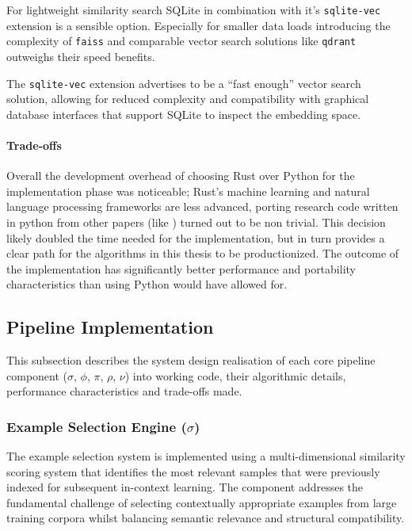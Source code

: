 For lightweight similarity search SQLite in combination with it's
\texttt{sqlite-vec} extension is a sensible option. Especially for smaller data
loads introducing the complexity of \texttt{faiss} and comparable vector search
solutions like \texttt{qdrant} outweighs their speed benefits.

The \texttt{sqlite-vec} extension advertises to be a ``fast enough'' vector
search solution, allowing for reduced complexity and compatibility with
graphical database interfaces that support SQLite to inspect the embedding
space.

\paragraph{Trade-offs}

Overall the development overhead of choosing Rust over Python for the
implementation phase was noticeable; Rust's machine learning and natural
language processing frameworks are less advanced, porting research code written
in python from other papers (like \cite{OmniSQL}) turned out to be non trivial.
This decision likely doubled the time needed for the implementation, but in
turn provides a clear path for the algorithms in this thesis to be
productionized. The outcome of the implementation has significantly better
performance and portability characteristics than using Python would have
allowed for.

\subsection{Pipeline Implementation}

This subsection describes the system design realisation of each core pipeline
component ($\sigma$, $\phi$, $\pi$, $\rho$, $\nu$) into working code, their
algorithmic details, performance characteristics and trade-offs made.

\subsubsection{Example Selection Engine ($\sigma$)}

The example selection system is implemented using a multi-dimensional similarity
scoring system that identifies the most relevant samples that were previously
indexed for subsequent in-context learning. The component addresses the
fundamental challenge of selecting contextually appropriate examples from large
training corpora whilst balancing semantic relevance and structural compatibility.

